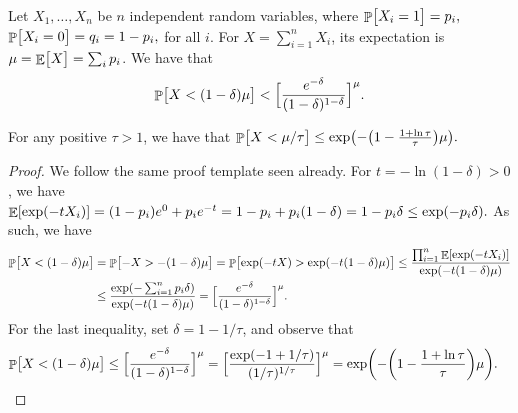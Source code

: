 \begin{theorem}
    Let $X_1, \ldots, X_n$ be $n$ independent random variables, where
    \begin{math}
        \Prob{ \bigl. X_i = 1 } =p_i,
    \end{math}
    \begin{math}
        \Prob{ \bigl. X_i = 0 } =q_i = 1-p_i,
    \end{math}
    for all $i$.
    For $X = \sum_{i=1}^{n} X_i$, its expectation is
     $\mu = \mathop{\mathbb{E}}\!\left[ {\bigl. X} \right] = \sum_i p_i$.  We have that
     \begin{equation*}
         \Prob{\bigl. X < (1-\delta)\mu } <
         \Bigl[  \frac{e^{-\delta}}{(1-\delta)^{1-\delta}} \Bigr]^\mu.
     \end{equation*}

    For any positive $\tau > 1$, we have that
    \begin{math}
      \Prob{ X < \mu/\tau \bigr.} %
      \leq%
      \exp\pth{-\pth{1 - \frac{1 + \ln \tau}{\tau}} \mu}.
  \end{math}
\end{theorem}


\begin{proof}
    We follow the same proof template seen already. For
    $t = - \ln( 1-\delta ) > 0$, we have
    \begin{math}
        \Ex{\exp( -t X_i)}%
        =%
        (1-p_i) e^0 + p_i e^{-t}%
        =%
        1-p_i + p_i ( 1-\delta)%
        =%
        1 - p_i\delta%
        \leq%
        \exp \pth{ -p_i \delta}.
    \end{math}
    As such, we have
    \begin{align*}
      \Prob{ X < (1-\delta)\mu \bigr.} %
      &=%
        \Prob{ -X > -(1-\delta)\mu \bigr.} %
        = %
        \Prob{ \exp( -t X)  > \exp\pth{-t(1-\delta)\mu} \bigr.}
        \leq %
        \frac{\prod_{i=1}^n \Ex{\exp( -t X_i)}}{\exp\pth{-t(1-\delta)\mu}}\\
      &
        \leq%
        \frac{\exp\pth{-\sum_{i=1}^n  p_i\delta}}
        {\exp\pth{-t(1-\delta)\mu}}  %
        =%
            \Bigl[  \frac{e^{-\delta}}{(1-\delta)^{1-\delta}} \Bigr]^\mu.
    \end{align*}
    For the last inequality, set $\delta = 1-1/\tau$, and observe that
    \begin{align*}
      \Prob{ X < (1-\delta)\mu \bigr.} %
      &
        \leq%
        \Bigl[  \frac{e^{-\delta}}{(1-\delta)^{1-\delta}} \Bigr]^\mu
        =%
        \Bigl[  \frac{\exp\pth{-1 + 1/\tau}}
        {(1/\tau)^{1/\tau}} \Bigr]^\mu
        =%
        \exp\pth{-\pth{1 - \frac{1 + \ln \tau}{\tau}} \mu}.
    \end{align*}
\end{proof}


